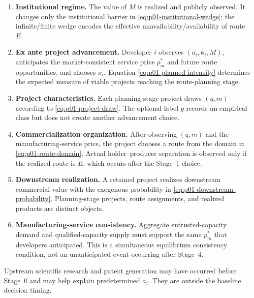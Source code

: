 \begin{enumerate}
  \item[Stage 0.] \textbf{Institutional regime.}  The value of \(M\) is
  realized and publicly observed.  It changes only the institutional barrier
  in \eqref{eq:p01-institutional-wedge}; the infinite/finite wedge encodes the
  effective unavailability/availability of route \(E\).

  \item[Stage 1.] \textbf{Ex ante project advancement.}  Developer \(i\)
  observes \((a_i,k_i,M)\), anticipates the market-consistent service price
  \(p_m^*\) and future route opportunities, and chooses \(x_i\).  Equation
  \eqref{eq:p01-planned-intensity} determines the expected measure of viable
  projects reaching the route-planning stage.

  \item[Stage 2.] \textbf{Project characteristics.}  Each planning-stage
  project draws \((q,m)\) according to \eqref{eq:p01-project-draw}.  The
  optional label \(g\) records an empirical class but does not create another
  advancement choice.

  \item[Stage 3.] \textbf{Commercialization organization.}  After observing
  \((q,m)\) and the manufacturing-service price, the project chooses a route
  from the domain in \eqref{eq:p01-route-domain}.  Actual holder--producer
  separation is observed only if the realized route is \(E\), which occurs
  after the Stage~1 choice.

  \item[Stage 4.] \textbf{Downstream realization.}  A retained project
  realizes downstream commercial value with the exogenous probability in
  \eqref{eq:p01-downstream-probability}.  Planning-stage projects, route
  assignments, and realized products are distinct objects.

  \item[Stage 5.] \textbf{Manufacturing-service consistency.}  Aggregate
  entrusted-capacity demand and qualified-capacity supply must support the same
  \(p_m^*\) that developers anticipated.  This is a simultaneous equilibrium
  consistency condition, not an unanticipated event occurring after Stage~4.
\end{enumerate}

Upstream scientific research and patent generation may have occurred before
Stage~0 and may help explain predetermined \(a_i\).  They are outside the
baseline decision timing.

